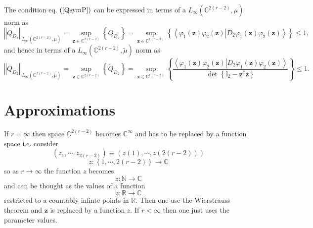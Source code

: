 \documentclass[aps,preprint]{revtex4}%
\begin{document}
The condition eq. $\left(  \ref{QsymP}\right)  $ can be expressed in terms of
a $L_{\infty}\left(  \mathbb{C}^{2\left(  r-2\right)  },\mu\right)  $ norm as
\begin{equation}
\left\Vert Q_{D_{2}}\right\Vert _{L_{\infty}\left(  \mathbb{C}^{2\left(
r-2\right)  },\mu\right)  }=\sup_{\mathbf{z\in}\mathbb{C}^{2\left(
r-2\right)  }}\left\{  Q_{D_{2}}\right\}  =\sup_{\mathbf{z\in}\mathbb{C}%
^{r\left(  r-2\right)  }}\left\{  \left\langle \varphi_{1}\left(
\mathbf{z}\right)  \varphi_{2}\left(  \mathbf{z}\right)  \left\vert
D_{2}\varphi_{1}\left(  \mathbf{z}\right)  \varphi_{2}\left(  \mathbf{z}%
\right)  \right.  \right\rangle \right\}  \leq1,
\end{equation}
and hence in terms of a $L_{\infty}\left(  \mathbb{C}^{2\left(  r-2\right)
},\tilde{\mu}\right)  $ norm as
\begin{equation}
\left\Vert Q_{D_{2}}\right\Vert _{L_{\infty}\left(  \mathbb{C}^{2\left(
r-2\right)  },\tilde{\mu}\right)  }=\sup_{\mathbf{z\in}\mathbb{C}^{2\left(
r-2\right)  }}\left\{  \tilde{Q}_{D_{2}}\right\}  =\sup_{\mathbf{z\in
}\mathbb{C}^{r\left(  r-2\right)  }}\left\{  \frac{\left\langle \varphi
_{1}\left(  \mathbf{z}\right)  \varphi_{2}\left(  \mathbf{z}\right)
\left\vert D_{2}\varphi_{1}\left(  \mathbf{z}\right)  \varphi_{2}\left(
\mathbf{z}\right)  \right.  \right\rangle }{\det\left\{  \mathbb{I}%
_{2}-\mathbf{z}^{\dagger}\mathbf{z}\right\}  }\right\}  \leq1.
\end{equation}


\section{Approximations}

If $r=\infty$ then space $\mathbb{C}^{2\left(  r-2\right)  }$ becomes
$\mathbb{C}^{\infty}$ and has to be replaced by a function space i.e.
consider
\begin{equation}
\left(  z_{1},\cdots,z_{2\left(  r-2\right)  }\right)  \equiv\left(  z\left(
1\right)  ,\cdots,z\left(  2\left(  r-2\right)  \right)  \right)
\end{equation}%
\begin{equation}
z:\left\{  1,\cdots,2\left(  r-2\right)  \right\}  \mathbb{\rightarrow C}%
\end{equation}
so as $r\rightarrow\infty$ the function $z$ becomes
\begin{equation}
z:\mathbb{N\rightarrow C}%
\end{equation}
and can be thought as the values of a function
\begin{equation}
z:\mathbb{R\rightarrow C}%
\end{equation}
restricted to a countably infinte points in $\mathbb{R}.$ Then one use the
Wierstrauss theorem and $\mathbf{z}$ is replaced by a function $z$. If
$r<\infty$ then one just uses the parameter values.
\end{document}
